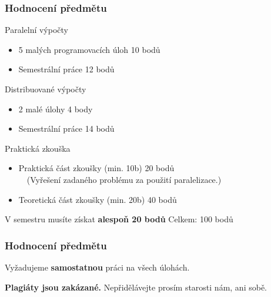 \documentclass[usenames,dvipsnames,9pt]{beamer}
\begin{document}
\begin{frame}
  \frametitle{Hodnocení předmětu}
  \vspace{0.5em}
  \begin{block}{Paralelní výpočty}
    \begin{itemize}
      \item 5 malých programovacích úloh \hfill 10 bodů
      \item Semestrální práce            \hfill 12 bodů
    \end{itemize}
  \end{block}
  \begin{block}{Distribuované výpočty}
    \begin{itemize}
      \item 2 malé úlohy                 \hfill  4 body
      \item Semestrální práce            \hfill 14 bodů
    \end{itemize}
  \end{block}
  \begin{block}{Praktická zkouška}
    \begin{itemize}
      \item Praktická část zkoušky (min. 10b)          \hfill 20 bodů \\
            {\small\ \ (Vyřešení zadaného problému za použití paralelizace.)}
      \item Teoretická část zkoušky (min. 20b)         \hfill 40 bodů
    \end{itemize}
  \end{block}
  V semestru musíte získat \textbf{alespoň 20 bodů} \hfill Celkem: 100 bodů
\end{frame}
\begin{frame}
  \frametitle{Hodnocení předmětu}
  \begin{center}
    \LARGE Vyžadujeme \textbf{samostatnou} práci na všech úlohách.
  \end{center}

  \vspace{2em}

  \faWarning \hspace{3pt}
  \textbf{Plagiáty jsou zakázané.} Nepřidělávejte prosím starosti nám, ani sobě.
\end{frame}

\end{document}
